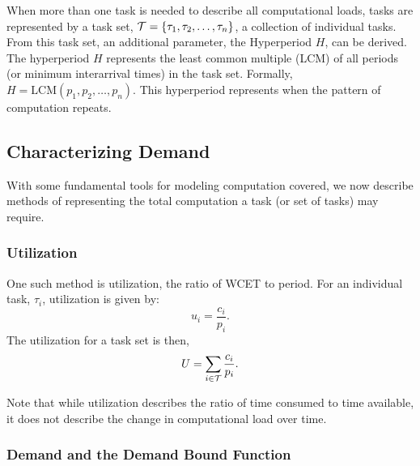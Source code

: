 When more than one task is needed to describe all computational loads, tasks are represented by a task set, $\mathcal{T} = \{\tau_1, \tau_2, \dots, \tau_n\}$, a collection of individual tasks.
From this task set, an additional parameter, the Hyperperiod $H$, can be derived.
The hyperperiod $H$ represents the least common multiple (LCM) of all periods (or minimum interarrival times) in  the task set.
Formally, $H = \text{LCM}(p_1, p_2, \dots, p_n)$.
This hyperperiod represents when the pattern of computation repeats.

\subsection{Characterizing Demand}

With some fundamental tools for modeling computation covered, we now describe methods of representing the total computation a task (or set of tasks) may require. 

\subsubsection{Utilization}

One such method is utilization, the ratio of WCET to period.
For an individual task, $\tau_i$, utilization is given by:
\begin{equation}
    u_i = \frac{c_i}{p_i}.
\end{equation}
The utilization for a task set is then,
\begin{equation}
    U = \sum_{i \in \mathcal{T}} \frac{c_i}{p_i}.
\end{equation}

Note that while utilization describes the ratio of time consumed to time available, it does not describe the change in computational load over time.

\subsubsection{Demand and the Demand Bound Function}

